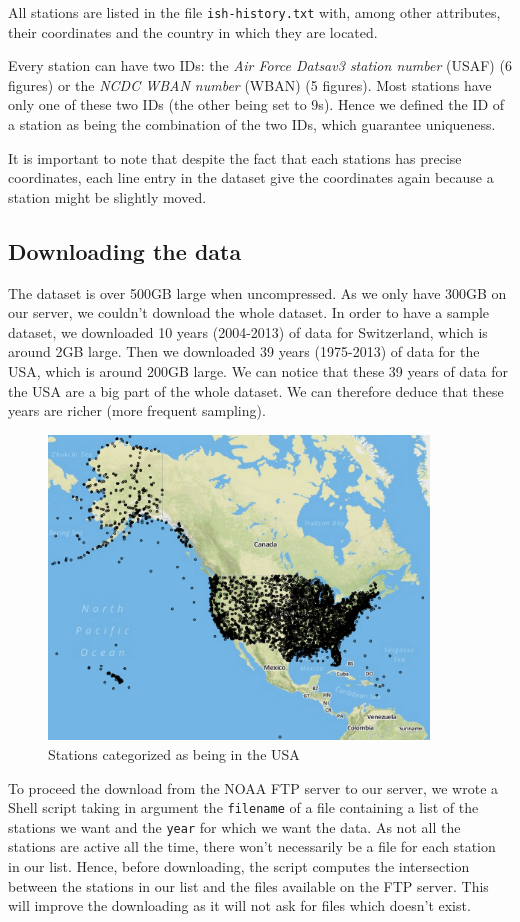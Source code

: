 All stations are listed in the file \texttt{ish-history.txt} with, among other attributes, their coordinates and the country in which they are located.

Every station can have two IDs: the \emph{Air Force Datsav3 station number} (USAF) (6 figures) or the \emph{NCDC WBAN number} (WBAN) (5 figures). Most stations have only one of these two IDs (the other being set to 9s). Hence we defined the ID of a station as being the combination of the two IDs, which guarantee uniqueness.

It is important to note that despite the fact that each stations has precise coordinates, each line entry in the dataset give the coordinates again because a station might be slightly moved.

\subsection{Downloading the data}
The dataset is over 500GB large when uncompressed. As we only have 300GB on our server, we couldn't download the whole dataset. In order to have a sample dataset, we downloaded 10 years (2004-2013) of data for Switzerland, which is around 2GB large. Then we downloaded 39 years (1975-2013) of data for the USA, which is around 200GB large. We can notice that these 39 years of data for the USA are a big part of the whole dataset. We can therefore deduce that these years are richer (more frequent sampling).

\begin{figure}[htb]
	\centering
	\includegraphics[width=0.9\textwidth]{figures/USStations.png}
	\caption{Stations categorized as being in the USA}
\end{figure}

To proceed the download from the NOAA FTP server to our server, we wrote a Shell script taking in argument the \texttt{filename} of a file containing a list of the stations we want and the \texttt{year} for which we want the data. As not all the stations are active all the time, there won't necessarily be a file for each station in our list. Hence, before downloading, the script computes the intersection between the stations in our list and the files available on the FTP server. This will improve the downloading as it will not ask for files which doesn't exist.